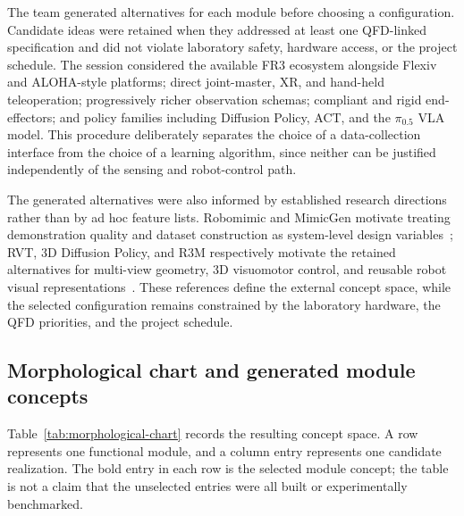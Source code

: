 The team generated alternatives for each module before choosing a configuration. Candidate ideas were retained when they addressed at least one QFD-linked specification and did not violate laboratory safety, hardware access, or the project schedule. The session considered the available FR3 ecosystem alongside Flexiv and ALOHA-style platforms; direct joint-master, XR, and hand-held teleoperation; progressively richer observation schemas; compliant and rigid end-effectors; and policy families including Diffusion Policy, ACT, and the $\pi_{0.5}$ VLA model. This procedure deliberately separates the choice of a data-collection interface from the choice of a learning algorithm, since neither can be justified independently of the sensing and robot-control path.

The generated alternatives were also informed by established research directions rather than by ad hoc feature lists. Robomimic and MimicGen motivate treating demonstration quality and dataset construction as system-level design variables~\cite{robomimic,mimicgen}; RVT, 3D Diffusion Policy, and R3M respectively motivate the retained alternatives for multi-view geometry, 3D visuomotor control, and reusable robot visual representations~\cite{rvt,dp3,r3m}. These references define the external concept space, while the selected configuration remains constrained by the laboratory hardware, the QFD priorities, and the project schedule.

\subsection{Morphological chart and generated module concepts}

Table~\ref{tab:morphological-chart} records the resulting concept space. A row represents one functional module, and a column entry represents one candidate realization. The bold entry in each row is the selected module concept; the table is not a claim that the unselected entries were all built or experimentally benchmarked.

